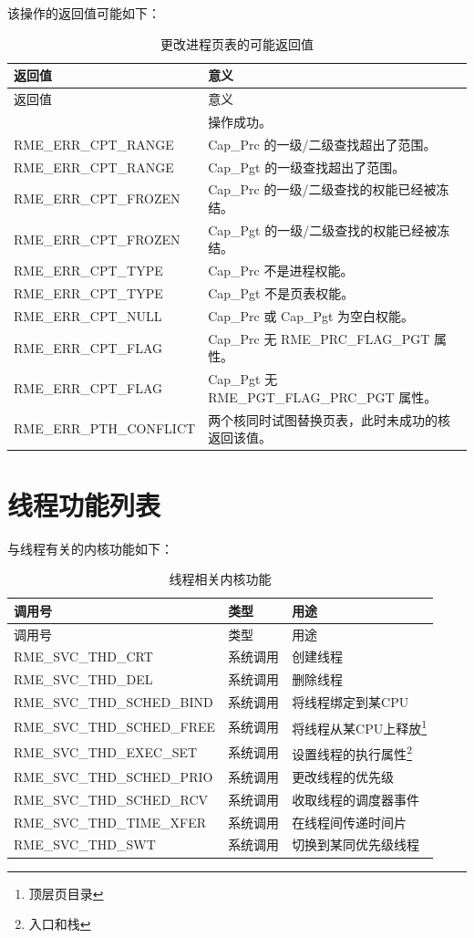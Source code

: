 该操作的返回值可能如下：

\begin{xltabular}{\textwidth}{@{}>{\hsize\raggedright\arraybackslash}X>{\hsize\raggedright\arraybackslash}X@{}}
\caption{更改进程页表的可能返回值}\label{tab:4-17-change-process-page-table-return-values}\\
\toprule
返回值 & 意义\tabularnewline
\endfirsthead
\toprule
返回值 & 意义\tabularnewline
\midrule
\endhead
\bottomrule
{} & 操作成功。\tabularnewline
    RME\_ERR\_CPT\_RANGE & Cap\_Prc 的一级/二级查找超出了范围。\tabularnewline
    RME\_ERR\_CPT\_RANGE & Cap\_Pgt 的一级查找超出了范围。\tabularnewline
    RME\_ERR\_CPT\_FROZEN & Cap\_Prc 的一级/二级查找的权能已经被冻结。\tabularnewline
    RME\_ERR\_CPT\_FROZEN & Cap\_Pgt 的一级/二级查找的权能已经被冻结。\tabularnewline
    RME\_ERR\_CPT\_TYPE & Cap\_Prc 不是进程权能。\tabularnewline
    RME\_ERR\_CPT\_TYPE & Cap\_Pgt 不是页表权能。\tabularnewline
    RME\_ERR\_CPT\_NULL & Cap\_Prc 或 Cap\_Pgt 为空白权能。\tabularnewline
    RME\_ERR\_CPT\_FLAG & Cap\_Prc 无 RME\_PRC\_FLAG\_PGT 属性。\tabularnewline
    RME\_ERR\_CPT\_FLAG & Cap\_Pgt 无 RME\_PGT\_FLAG\_PRC\_PGT 属性。\tabularnewline
    RME\_ERR\_PTH\_CONFLICT & 两个核同时试图替换页表，此时未成功的核返回该值。\tabularnewline
\end{xltabular}

\section{线程功能列表}\label{sec:4-thread-function-list}

与线程有关的内核功能如下：

\begin{xltabular}{\textwidth}{@{}>{\hsize\raggedright\arraybackslash}X>{\hsize\raggedright\arraybackslash}X>{\hsize\raggedright\arraybackslash}X@{}}
\caption{线程相关内核功能}\label{tab:4-18-thread-related-kernel-functions}\\
\toprule
调用号 & 类型 & 用途\tabularnewline
\endfirsthead
\toprule
调用号 & 类型 & 用途\tabularnewline
\midrule
\endhead
\bottomrule
\endlastfoot
RME\_SVC\_THD\_CRT & 系统调用 & 创建线程\tabularnewline
RME\_SVC\_THD\_DEL & 系统调用 & 删除线程\tabularnewline
RME\_SVC\_THD\_SCHED\_BIND & 系统调用 & 将线程绑定到某CPU\tabularnewline
RME\_SVC\_THD\_SCHED\_FREE & 系统调用 &
将线程从某CPU上释放\footnote{顶层页目录}\tabularnewline
RME\_SVC\_THD\_EXEC\_SET & 系统调用 &
设置线程的执行属性\footnote{入口和栈}\tabularnewline
RME\_SVC\_THD\_SCHED\_PRIO & 系统调用 & 更改线程的优先级\tabularnewline
RME\_SVC\_THD\_SCHED\_RCV & 系统调用 &
收取线程的调度器事件\tabularnewline
RME\_SVC\_THD\_TIME\_XFER & 系统调用 & 在线程间传递时间片\tabularnewline
RME\_SVC\_THD\_SWT & 系统调用 & 切换到某同优先级线程\tabularnewline
\end{xltabular}

